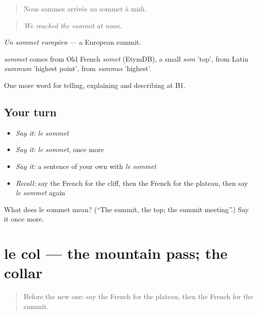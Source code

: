 \begin{quote}
Nous sommes arrivés au sommet à midi.
\end{quote}

\begin{quote}
\emph{We reached the summit at noon.}
\end{quote}

\emph{Un sommet européen} — a European summit.

\begin{cousinweb}
\emph{sommet} comes from Old French \emph{somet} (EtymDB), a small \emph{som} 'top', from Latin \emph{summum} 'highest point', from \emph{summus} 'highest'.
\end{cousinweb}

\begin{grammarlens}[title={What you've built}]
One more word for telling, explaining and describing at B1.
\end{grammarlens}

\subsection*{Your turn}
\begin{itemize}
\raggedright
  \item \emph{Say it:} \emph{le sommet}
  \item \emph{Say it:} \emph{le sommet}, once more
  \item \emph{Say it:} a sentence of your own with \emph{le sommet}
  \item \emph{Recall:} say the French for the cliff, then the French for the plateau, then say \emph{le sommet} again
\end{itemize}

\begin{tcolorbox}[breakable,colback=teal!4,colframe=teal!35!black,title={Before you move on}]
What does le sommet mean? (\textquotedblleft{}The summit, the top; the summit meeting\textquotedblright{}.) Say it once more.
\end{tcolorbox}
\section[le col]{le col — the mountain pass; the collar}

\label{lesson:FR-C454-col}



\begin{quote}
Before the new one: say the French for the plateau, then the French for the summit.
\end{quote}

